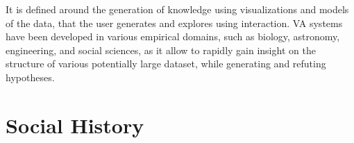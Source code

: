 
It is defined around the generation of knowledge using visualizations and models of the data, that the user generates and explores using interaction.
VA systems have been developed in various empirical domains, such as biology, astronomy, engineering, and social sciences, as it allow to rapidly gain insight on the structure of various potentially large dataset, while generating and refuting hypotheses. %





\section{Social History}\label{sec:historical-network-research}

